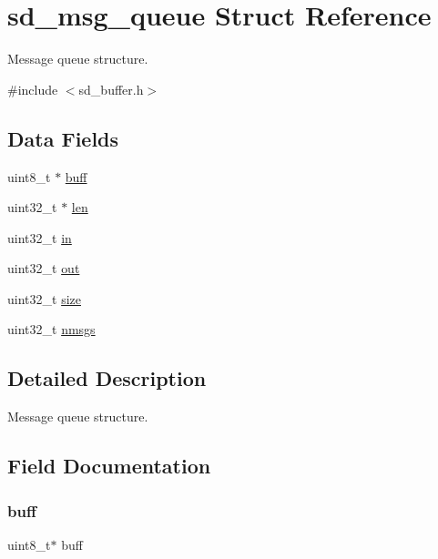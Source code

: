 \hypertarget{structsd__msg__queue}{}\section{sd\+\_\+msg\+\_\+queue Struct Reference}
\label{structsd__msg__queue}


Message queue structure.  




{\ttfamily \#include $<$sd\+\_\+buffer.\+h$>$}

\subsection*{Data Fields}
\begin{DoxyCompactItemize}
\item 
uint8\+\_\+t $\ast$ \mbox{\hyperlink{structsd__msg__queue_a8b212742c92a124f2eb4a244acc19f7c}{buff}}
\item 
uint32\+\_\+t $\ast$ \mbox{\hyperlink{structsd__msg__queue_a4311b7376ae8adcd508957d7f7e94a5e}{len}}
\item 
uint32\+\_\+t \mbox{\hyperlink{structsd__msg__queue_a86fd6c417fa43c58339f7cde29495419}{in}}
\item 
uint32\+\_\+t \mbox{\hyperlink{structsd__msg__queue_ab27775f0ed2b042b439a7431fbe311eb}{out}}
\item 
uint32\+\_\+t \mbox{\hyperlink{structsd__msg__queue_ab2c6b258f02add8fdf4cfc7c371dd772}{size}}
\item 
uint32\+\_\+t \mbox{\hyperlink{structsd__msg__queue_acbd45720315c5c8ac04d64e460d2ab5a}{nmsgs}}
\end{DoxyCompactItemize}


\subsection{Detailed Description}
Message queue structure. 

\subsection{Field Documentation}
\mbox{\label{structsd__msg__queue_a8b212742c92a124f2eb4a244acc19f7c}} 
\subsubsection{\texorpdfstring{buff}{buff}}
{\footnotesize\ttfamily uint8\+\_\+t$\ast$ buff}

